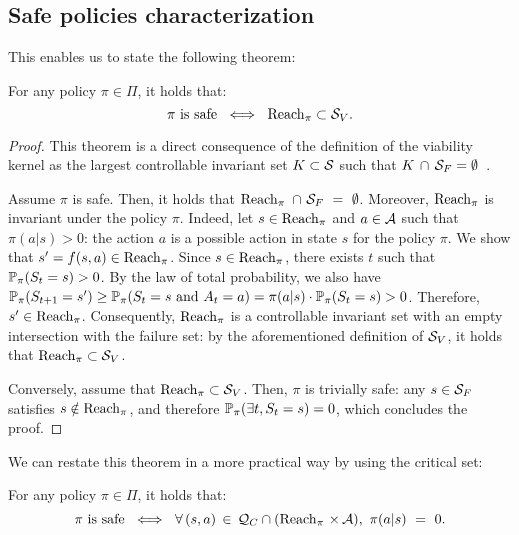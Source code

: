 \subsection{Safe policies characterization} \label{sec:safe policies characterization}
This enables us to state the following theorem:
\begin{theorem}
	For any policy $\pi\in\Pi$, it holds that:
	\begin{equation}
		\pi\text{ is safe}~\iff~\reach_\pi\subset\SV. \label{eq:safe policies stabilize sv}
	\end{equation}
	\label{thm:safe policies stabilize sv}
\end{theorem}
\begin{proof}
	This theorem is a direct consequence of the definition of the viability kernel as the largest controllable invariant set $K \subset\S$ such that $K \,\cap\,\SF=\emptyset$~\cite[Definition\,4.1.1]{aubin2011viability}.\par
	Assume $\pi$ is safe. Then, it holds that $\reach_\pi~\cap~\SF~=~\emptyset$. Moreover, $\reach_\pi$ is invariant under the policy $\pi$. Indeed, let $s\in\reach_\pi$ and $a\in\A$ such that $\pi(a|s) > 0$: the action $a$ is a possible action in state $s$ for the policy $\pi$. We show that $s' = f(s, a)\in\reach_\pi$. Since $s\in\reach_\pi$, there exists $t$ such that $\P_\pi(S_t = s) > 0$. By the law of total probability, we also have $\P_\pi(S_{t+1} = s') \geq \P_\pi(S_t = s~\text{and}~A_t = a) = \pi(a|s)\cdot\P_\pi(S_t = s) > 0$. Therefore, $s'\in\reach_\pi$. Consequently, $\reach_\pi$ is a controllable invariant set with an empty intersection with the failure set: by the aforementioned definition of $\SV$, it holds that $\reach_\pi\subset\SV$.\par
	Conversely, assume that $\reach_\pi\subset\SV$. Then, $\pi$ is trivially safe: any $s\in\SF$ satisfies $s\notin\reach_\pi$, and therefore $\P_\pi(\exists t, S_t = s) = 0$, which concludes the proof.
\end{proof}
We can restate this theorem in a more practical way by using the critical set:
\begin{corollary} \label{clry:safe policies on qc}
	For any policy $\pi\in\Pi$, it holds that:
	\begin{equation}
	\pi\text{ is safe}~\iff~\forall\,(s, a)\,\in\, \QC \cap (\reach_\pi\,\times\,\A),~\pi(a|s)~=~0. \label{eq:safe policies on qc}
	\end{equation}
\end{corollary}
